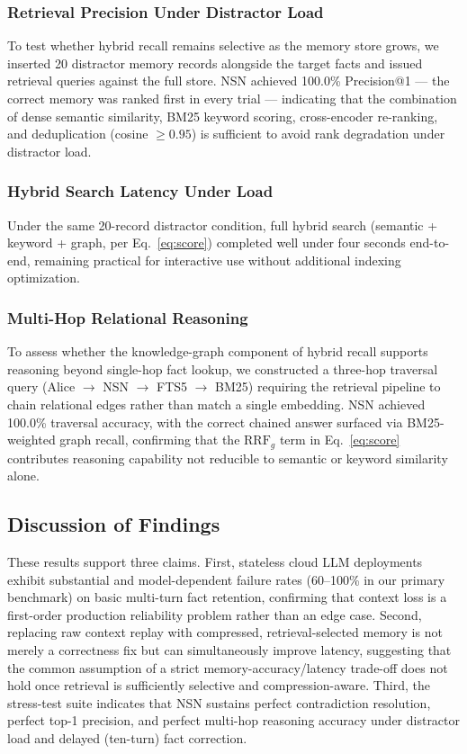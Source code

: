 \documentclass[conference]{IEEEtran}
\begin{document}
\subsubsection{Retrieval Precision Under Distractor Load}
To test whether hybrid recall remains selective as the memory store grows, we inserted 20 distractor memory records alongside the target facts and issued retrieval queries against the full store. NSN achieved 100.0\% Precision@1 --- the correct memory was ranked first in every trial --- indicating that the combination of dense semantic similarity, BM25 keyword scoring, cross-encoder re-ranking, and deduplication (cosine $\geq 0.95$) is sufficient to avoid rank degradation under distractor load.

\subsubsection{Hybrid Search Latency Under Load}
Under the same 20-record distractor condition, full hybrid search (semantic + keyword + graph, per Eq.~\ref{eq:score}) completed well under four seconds end-to-end, remaining practical for interactive use without additional indexing optimization.

\subsubsection{Multi-Hop Relational Reasoning}
To assess whether the knowledge-graph component of hybrid recall supports reasoning beyond single-hop fact lookup, we constructed a three-hop traversal query (Alice $\rightarrow$ NSN $\rightarrow$ FTS5 $\rightarrow$ BM25) requiring the retrieval pipeline to chain relational edges rather than match a single embedding. NSN achieved 100.0\% traversal accuracy, with the correct chained answer surfaced via BM25-weighted graph recall, confirming that the $\text{RRF}_g$ term in Eq.~\ref{eq:score} contributes reasoning capability not reducible to semantic or keyword similarity alone.

\subsection{Discussion of Findings}
These results support three claims. First, stateless cloud LLM deployments exhibit substantial and model-dependent failure rates (60--100\% in our primary benchmark) on basic multi-turn fact retention, confirming that context loss is a first-order production reliability problem rather than an edge case. Second, replacing raw context replay with compressed, retrieval-selected memory is not merely a correctness fix but can simultaneously improve latency, suggesting that the common assumption of a strict memory-accuracy/latency trade-off does not hold once retrieval is sufficiently selective and compression-aware. Third, the stress-test suite indicates that NSN sustains perfect contradiction resolution, perfect top-1 precision, and perfect multi-hop reasoning accuracy under distractor load and delayed (ten-turn) fact correction.
\end{document}
